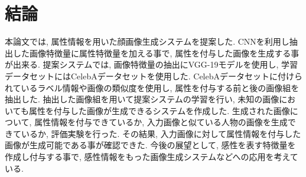 \chapter{結論}
本論文では, 属性情報を用いた顔画像生成システムを提案した. CNNを利用し抽出した画像特徴量に属性特徴量を加える事で, 属性を付与した画像を生成する事が出来る. 
提案システムでは, 画像特徴量の抽出にVGG-19モデルを使用し, 学習データセットにはCelebAデータセットを使用した. CelebAデータセットに付けられているラベル情報や画像の類似度を使用し, 属性を付与する前と後の画像組を抽出した. 抽出した画像組を用いて提案システムの学習を行い, 未知の画像においても属性を付与した画像が生成できるシステムを作成した. 
生成された画像について, 属性情報を付与できているか, 入力画像と似ている人物の画像を生成できているか, 評価実験を行った. その結果, 入力画像に対して属性情報を付与した画像が生成可能である事が確認できた. 
今後の展望として, 感性を表す特徴量を作成し付与する事で, 感性情報をもった画像生成システムなどへの応用を考えている. 
